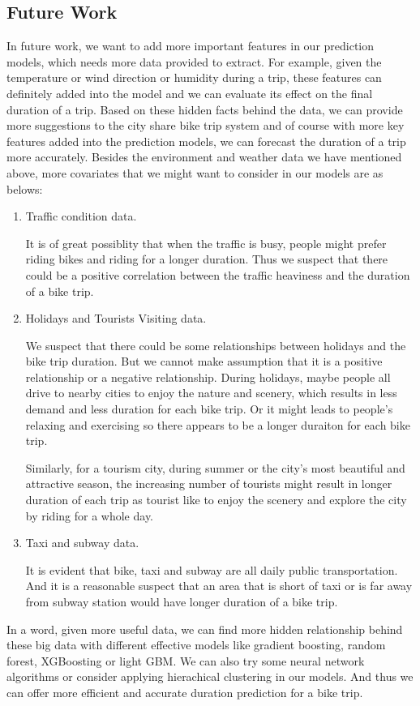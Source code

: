 \subsection{Future Work}
In future work, we want to add more important features in our prediction models, which needs more data provided to extract. For example, given the temperature or wind direction or humidity during a trip, these features can definitely added into the model and we can evaluate its effect on the final duration of a trip. Based on these hidden facts behind the data, we can provide more suggestions to the city share bike trip system and of course with more key features added into the prediction models, we can forecast the duration of a trip more accurately. Besides the environment and weather data we have mentioned above, more covariates that we might want to consider in our models are as belows:
\begin{enumerate}
	\item Traffic condition data.
	\par It is of great possiblity that when the traffic is busy, people might prefer riding bikes and riding for a longer duration. Thus we suspect that there could be a positive correlation between the traffic heaviness and the duration of a bike trip.
	\item Holidays and Tourists Visiting data.
	\par We suspect that there could be some relationships between holidays and the bike trip duration. But we cannot make assumption that it is a positive relationship or a negative relationship. During holidays, maybe people all drive to nearby cities to enjoy the nature and scenery, which results in less demand and less duration for each bike trip. Or it might leads to people's relaxing and exercising so there appears to be a longer duraiton for each bike trip. 
	\par Similarly, for a tourism city, during summer or the city's most beautiful and attractive season, the increasing number of tourists might result in longer duration of each trip as tourist like to enjoy the scenery and explore the city by riding for a whole day.
	\item Taxi and subway data.
	\par It is evident that bike, taxi and subway are all daily public transportation. And it is a reasonable suspect that an area that is short of taxi or is far away from subway station would have longer duration of a bike trip.
\end{enumerate}

\par In a word, given more useful data, we can find more hidden relationship behind these big data with different effective models like gradient boosting, random forest, XGBoosting or light GBM. We can also try some neural network algorithms or consider applying hierachical clustering in our models. And thus we can offer more efficient and accurate duration prediction for a bike trip.



